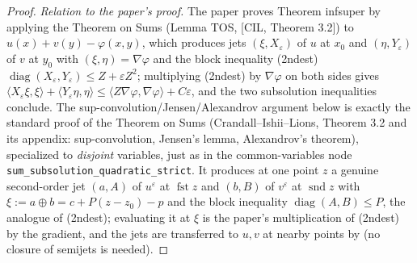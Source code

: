 \begin{proof}
\emph{Relation to the paper's proof.} The paper proves Theorem infsuper by applying the Theorem on Sums (Lemma TOS, [CIL, Theorem 3.2]) to $u(x)+v(y)-\varphi(x,y)$, which produces jets $(\xi,X_\varepsilon)$ of $u$ at $x_0$ and $(\eta,Y_\varepsilon)$ of $v$ at $y_0$ with $(\xi,\eta)=\nabla\varphi$ and the block inequality (2ndest) $\operatorname{diag}(X_\varepsilon,Y_\varepsilon)\le Z+\varepsilon Z^2$; multiplying (2ndest) by $\nabla\varphi$ on both sides gives $\langle X_\varepsilon\xi,\xi\rangle+\langle Y_\varepsilon\eta,\eta\rangle\le\langle Z\nabla\varphi,\nabla\varphi\rangle+C\varepsilon$, and the two subsolution inequalities conclude. The sup-convolution/Jensen/Alexandrov argument below is exactly the standard proof of the Theorem on Sums (Crandall--Ishii--Lions, Theorem 3.2 and its appendix: sup-convolution, Jensen's lemma, Alexandrov's theorem), specialized to \emph{disjoint} variables, just as in the common-variables node \texttt{sum\_subsolution\_quadratic\_strict}. It produces at one point $z$ a genuine second-order jet $(a,A)$ of $u^\varepsilon$ at $\operatorname{fst}z$ and $(b,B)$ of $v^\varepsilon$ at $\operatorname{snd}z$ with $\xi:=a\oplus b=c+P(z-z_0)-p$ and the block inequality $\operatorname{diag}(A,B)\le P$, the analogue of (2ndest); evaluating it at $\xi$ is the paper's multiplication of (2ndest) by the gradient, and the jets are transferred to $u,v$ at nearby points by  (no closure of semijets is needed).


\end{proof}
